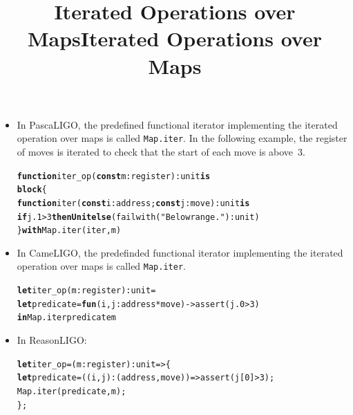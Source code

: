 \documentclass[wide]{slides}
\newcommand{\Kblock}[0]{\textbf{block}\xspace}
\newcommand{\Kconst}[0]{\textbf{const}\xspace}
\newcommand{\Kelse}[0]{\textbf{else}\xspace}
\newcommand{\Kfunction}[0]{\textbf{function}\xspace}
\newcommand{\Kif}[0]{\textbf{if}\xspace}
\newcommand{\Kin}[0]{\textbf{in}\xspace}
\newcommand{\Kis}[0]{\textbf{is}\xspace}
\newcommand{\Kthen}[0]{\textbf{then}\xspace}
\newcommand{\KUnit}[0]{\textbf{Unit}\xspace}
\newcommand{\Kwith}[0]{\textbf{with}\xspace}
\newcommand{\Kfun}[0]{\textbf{fun}\xspace}
\newcommand{\Klet}[0]{\textbf{let}\xspace}
\begin{document}
\begin{slide}
  \title{Iterated Operations over Maps}

  \begin{itemize}

    \item In PascaLIGO, the predefined functional iterator
      implementing the iterated operation over maps is called
      \texttt{Map.iter}. In the following example, the register of
      moves is iterated to check that the start of each move is
      above~\(3\).
      \begin{alltt}
\Kfunction iter_op (\Kconst m : register) : unit \Kis
  \Kblock \{
    \Kfunction iter (\Kconst i : address; \Kconst j : move) : unit \Kis
      \Kif j.1 > 3 \Kthen \KUnit \Kelse (failwith ("Below range.") : unit)
  \} \Kwith Map.iter (iter, m)
      \end{alltt}

  \end{itemize}

\end{slide}

\begin{slide}
  \title{Iterated Operations over Maps}

  \begin{itemize}

    \item In CameLIGO, the predefinded functional iterator
      implementing the iterated operation over maps is called
      \texttt{Map.iter}.
      \begin{alltt}
\Klet iter_op (m : register) : unit =
  \Klet predicate = \Kfun (i,j : address * move) -> assert (j.0 > 3)
  \Kin Map.iter predicate m
      \end{alltt}

    \item In ReasonLIGO:
      \begin{alltt}
\Klet iter_op = (m : register) : unit => \{
  \Klet predicate = ((i,j) : (address, move)) => assert (j[0] > 3);
  Map.iter (predicate, m);
\};
      \end{alltt}

  \end{itemize}

\end{slide}
\end{document}
